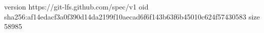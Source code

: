version https://git-lfs.github.com/spec/v1
oid sha256:af14edacf3a0f390d14da2199f10aecad6f6f143b63f6b45010c624f57430583
size 58985
